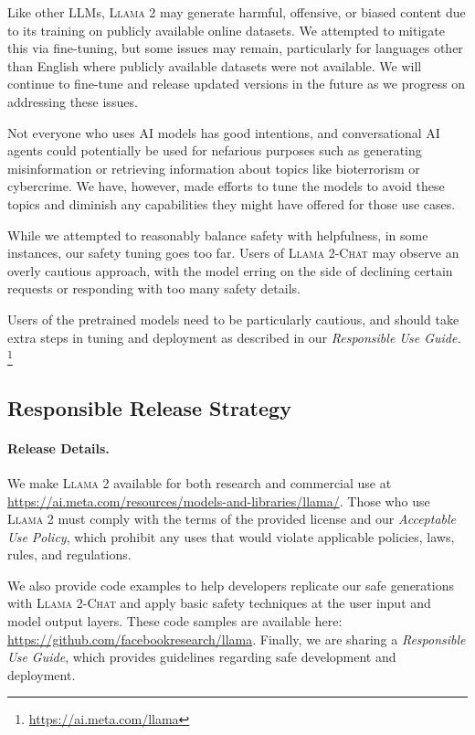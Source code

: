 \documentclass{article}
\newcommand{\modelname}{\textsc{Llama 2-Chat}\xspace}
\newcommand{\cinnamon}{\textsc{Llama 2}\xspace}
\begin{document}
Like other LLMs, \cinnamon may generate harmful, offensive, or biased content due to its training on publicly available online datasets. We attempted to mitigate this via fine-tuning, but some issues may remain, particularly for languages other than English where publicly available datasets were not available. We will continue to fine-tune and release updated versions in the future as we progress on addressing these issues.

Not everyone who uses AI models has good intentions, and conversational AI agents could potentially be used for nefarious purposes such as generating misinformation or retrieving information about topics like bioterrorism or cybercrime.  We have, however, made efforts to tune the models to avoid these topics and diminish any capabilities they might have offered for those use cases. 

While we attempted to reasonably balance safety with helpfulness, in some instances, our safety tuning goes too far. Users of \modelname{} may observe an overly cautious approach, with the model erring on the side of declining certain requests or responding with too many safety details. 

Users of the pretrained models need to be particularly cautious, and should take extra steps in tuning and deployment as described in our \textit{Responsible Use Guide.} \footnote{\url{https://ai.meta.com/llama}}

\subsection{Responsible Release Strategy}
\label{sec:responsible_release_strategy}
\paragraph{Release Details.}
We make \cinnamon available for both research and commercial use at \url{https://ai.meta.com/resources/models-and-libraries/llama/}. Those who use \cinnamon must comply with the terms of the provided license and our \textit{Acceptable Use Policy}, which prohibit any uses that would violate applicable policies, laws, rules, and regulations.

We also provide code examples to help developers replicate our safe generations with \modelname and apply basic safety techniques at the user input and model output layers. These code samples are available here: \url{https://github.com/facebookresearch/llama}. Finally, we are sharing a \textit{Responsible Use Guide}, which provides guidelines regarding safe development and deployment.
\end{document}
